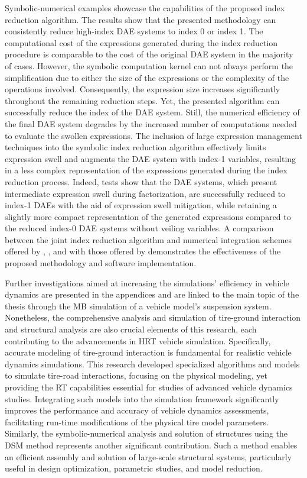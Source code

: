 Symbolic-numerical examples showcase the capabilities of the proposed index reduction algorithm. The results show that the presented methodology can consistently reduce high-index \ac{DAE} systems to index 0 or index 1. The computational cost of the expressions generated during the index reduction procedure is comparable to the cost of the original \ac{DAE} system in the majority of cases. However, the \Maple{} symbolic computation kernel can not always perform the simplification due to either the size of the expressions or the complexity of the operations involved. Consequently, the expression size increases significantly throughout the remaining reduction steps. Yet, the presented algorithm can successfully reduce the index of the \ac{DAE} system. Still, the numerical efficiency of the final \ac{DAE} system degrades by the increased number of computations needed to evaluate the swollen expressions. The inclusion of large expression management techniques into the symbolic index reduction algorithm effectively limits expression swell and augments the \ac{DAE} system with index-1 variables, resulting in a less complex representation of the expressions generated during the index reduction process. Indeed, tests show that the \ac{DAE} systems, which present intermediate expression swell during factorization, are successfully reduced to index-1 \acp{DAE} with the aid of expression swell mitigation, while retaining a slightly more compact representation of the generated expressions compared to the reduced index-0 \ac{DAE} systems without veiling variables. A comparison between the joint index reduction algorithm and numerical integration schemes offered by \Maple{}, \Mathematica{}, and \Matlab{} with those offered by \Indigo{} demonstrates the effectiveness of the proposed methodology and software implementation.

Further investigations aimed at increasing the simulations' efficiency in vehicle dynamics are presented in the appendices and are linked to the main topic of the thesis through the \ac{MB} simulation of a vehicle model's suspension system. Nonetheless, the comprehensive analysis and simulation of tire-ground interaction and structural analysis are also crucial elements of this research, each contributing to the advancements in \ac{HRT} vehicle simulation. Specifically, accurate modeling of tire-ground interaction is fundamental for realistic vehicle dynamics simulations. This research developed specialized algorithms and models to simulate tire-road interactions, focusing on the physical modeling, yet providing the \ac{RT} capabilities essential for studies of advanced vehicle dynamics studies. Integrating such models into the simulation framework significantly improves the performance and accuracy of vehicle dynamics assessments, facilitating run-time modifications of the physical tire model parameters. Similarly, the symbolic-numerical analysis and solution of structures using the \ac{DSM} method represents another significant contribution. Such a method enables an efficient assembly and solution of large-scale structural systems, particularly useful in design optimization, parametric studies, and model reduction.

